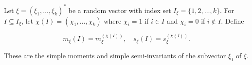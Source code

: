 Let $\xi = (\xi_1, \ldots, \xi_k)^*$ be a random vector with index set $I_\xi = \{1, 2, \ldots, k\}$. For $I \subseteq I_\xi$, let $\chi(I) = (\chi_1, \ldots, \chi_k)$ where $\chi_i = 1$ if $i \in I$ and $\chi_i = 0$ if $i \notin I$. Define

$$m_\xi(I) = m_\xi^{(\chi(I))}, \quad s_\xi(I) = s_\xi^{(\chi(I))}.$$

These are the simple moments and simple semi-invariants of the subvector $\xi_I$ of $\xi$.
